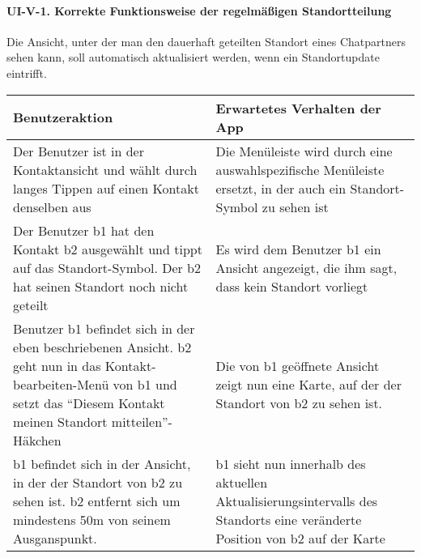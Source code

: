 \paragraph{UI-V-1. Korrekte Funktionsweise der regelmäßigen
Standortteilung}\label{korrekte-funktionsweise-der-regelmuxe4uxdfigen-standortteilung}

Die Ansicht, unter der man den dauerhaft geteilten Standort eines
Chatpartners sehen kann, soll automatisch aktualisiert werden, wenn ein
Standortupdate eintrifft.

\begin{longtable}{|p{8cm}|p{8.5cm}|}
\hline
Benutzeraktion & Erwartetes Verhalten der App\tabularnewline
\hline

Der Benutzer ist in der Kontaktansicht und wählt durch langes Tippen auf
einen Kontakt denselben aus & Die Menüleiste wird durch eine
auswahlspezifische Menüleiste ersetzt, in der auch ein Standort-Symbol
zu sehen ist\tabularnewline
Der Benutzer b1 hat den Kontakt b2 ausgewählt und tippt auf das
Standort-Symbol. Der b2 hat seinen Standort noch nicht geteilt & Es wird
dem Benutzer b1 ein Ansicht angezeigt, die ihm sagt, dass kein Standort
vorliegt\tabularnewline
Benutzer b1 befindet sich in der eben beschriebenen Ansicht. b2 geht nun
in das Kontakt-bearbeiten-Menü von b1 und setzt das ``Diesem Kontakt
meinen Standort mitteilen''-Häkchen & Die von b1 geöffnete Ansicht zeigt
nun eine Karte, auf der der Standort von b2 zu sehen ist.\tabularnewline
b1 befindet sich in der Ansicht, in der der Standort von b2 zu sehen
ist. b2 entfernt sich um mindestens 50m von seinem Ausganspunkt. & b1
sieht nun innerhalb des aktuellen Aktualisierungsintervalls des
Standorts eine veränderte Position von b2 auf der Karte\tabularnewline
\hline
\end{longtable}
